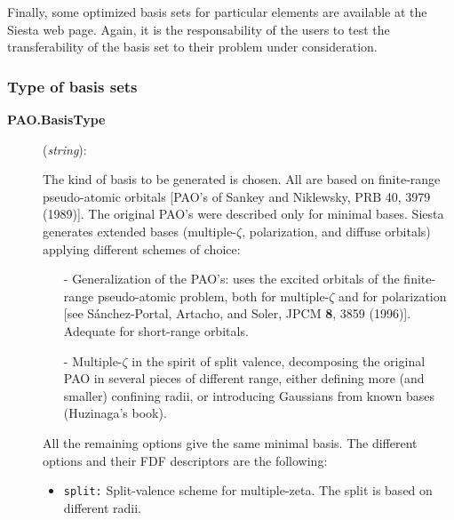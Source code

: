 \documentclass[11pt]{article}
\begin{document}
Finally, some optimized basis sets for particular elements are
available at the {\sc Siesta} web page.  Again, it is the
responsability of the users to test the transferability of the basis
set to their problem under consideration.


\subsubsection{Type of basis sets}

\begin{description}

\item[{\bf PAO.BasisType}] ({\it string}):

The kind of basis to be generated is chosen. All are based on
finite-range pseudo-atomic orbitals [PAO's of Sankey and Niklewsky, PRB 40, 3979 (1989)]. The
original PAO's were described only for minimal bases. {\sc Siesta}
generates extended bases (multiple-$\zeta$,
polarization, and diffuse
orbitals) applying different schemes of choice:

\begin{itemize}

\item[-] Generalization of the PAO's: uses the excited orbitals of the
finite-range pseudo-atomic problem, both for multiple-$\zeta$ and for
polarization [see S\'anchez-Portal, Artacho, and Soler, JPCM {\bf 8},
3859 (1996)]. Adequate for short-range orbitals.

\item[-] Multiple-$\zeta$ in the spirit of split valence, decomposing the original PAO in several pieces of different
range, either defining more (and smaller) confining radii, or
introducing Gaussians from known bases (Huzinaga's
book).
\end{itemize}

\noindent
All the remaining options
give the same minimal basis.
The different options and their FDF descriptors are the following:

\begin{itemize}

\item {\tt split:} Split-valence scheme for multiple-zeta.
The split is based on different radii.


\end{itemize}
\end{description}
\end{document}
